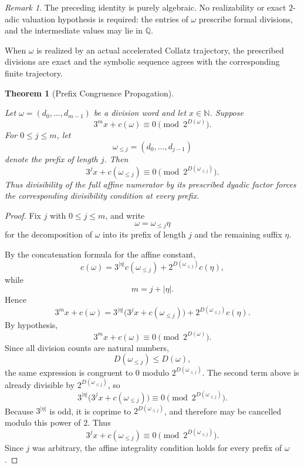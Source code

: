\documentclass[12pt, oneside]{article}
\numberwithin{equation}{section}
\theoremstyle{definition}
\theoremstyle{plain}
\newtheorem{theorem}{Theorem}[section]
\theoremstyle{remark}
\newtheorem*{remark}{Remark}
\begin{document}
\begin{remark}
The preceding identity is purely algebraic. No realizability or exact
\(2\)-adic valuation hypothesis is required: the entries of \(\omega\)
prescribe formal divisions, and the intermediate values may lie in
\(\mathbb Q\).

When \(\omega\) is realized by an actual accelerated Collatz trajectory,
the prescribed divisions are exact and the symbolic sequence agrees with
the corresponding finite trajectory.
\end{remark}

\begin{theorem}[Prefix Congruence Propagation]
\label{thm:prefix-congruence-propagation}

Let \(\omega=(d_0,\dots,d_{m-1})\) be a division word and let
\(x\in\mathbb N\). Suppose
\[
3^m x+c(\omega) \equiv0 \pmod{2^{D(\omega)}}.
\]
For \(0\le j\le m\), let
\[
\omega_{\le j}=(d_0,\dots,d_{j-1})
\]
denote the prefix of length \(j\). Then
\[
3^j x+c(\omega_{\le j}) \equiv0 \pmod{2^{D(\omega_{\le j})}}.
\]
Thus divisibility of the full affine numerator by its prescribed dyadic
factor forces the corresponding divisibility condition at every prefix.
\end{theorem}


\begin{proof}
Fix \(j\) with \(0\le j\le m\), and write
\[
\omega=\omega_{\le j}\eta
\]
for the decomposition of \(\omega\) into its prefix of length \(j\) and
the remaining suffix \(\eta\).

By the concatenation formula for the affine constant,
\[
c(\omega) = 3^{|\eta|}c(\omega_{\le j}) + 2^{D(\omega_{\le j})}c(\eta),
\]
while
\[
m=j+|\eta|.
\]
Hence
\[
3^m x+c(\omega) = 3^{|\eta|} \bigl(3^j x+c(\omega_{\le j})\bigr) + 2^{D(\omega_{\le j})}c(\eta).
\]
By hypothesis,
\[
3^m x+c(\omega)\equiv0\pmod{2^{D(\omega)}}.
\]
Since all division counts are natural numbers,
\[
D(\omega_{\le j})\le D(\omega),
\]
the same expression is congruent to \(0\) modulo
\(2^{D(\omega_{\le j})}\). The second term above is already divisible by
\(2^{D(\omega_{\le j})}\), so
\[
3^{|\eta|} \bigl(3^j x+c(\omega_{\le j})\bigr) \equiv0 \pmod{2^{D(\omega_{\le j})}}.
\]
Because \(3^{|\eta|}\) is odd, it is coprime to
\(2^{D(\omega_{\le j})}\), and therefore may be cancelled modulo this
power of \(2\). Thus
\[
3^j x+c(\omega_{\le j}) \equiv0 \pmod{2^{D(\omega_{\le j})}}.
\]
Since \(j\) was arbitrary, the affine integrality condition holds for
every prefix of \(\omega\).
\end{proof}
\end{document}
